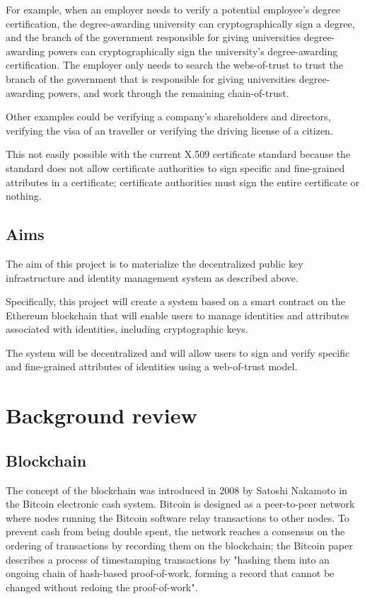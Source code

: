 \documentclass[12pt,a4paper]{report}
\begin{document}
	For example, when an employer needs to verify a potential employee's degree certification, the degree-awarding university can cryptographically sign a degree, and the branch of the government responsible for giving universities degree-awarding powers can cryptographically sign the university's degree-awarding certification. The employer only needs to search the webs-of-trust to trust the branch of the government that is responsible for giving universities degree-awarding powers, and work through the remaining chain-of-trust.
	
	Other examples could be verifying a company's shareholders and directors, verifying the visa of an traveller or verifying the driving license of a citizen.
	
	This not easily possible with the current X.509 certificate standard because the standard does not allow certificate authorities to sign specific and fine-grained attributes in a certificate; certificate authorities must sign the entire certificate or nothing.
	
	
	\section{Aims}
	The aim of this project is to materialize the decentralized public key infrastructure and identity management system as described above.
	
	Specifically, this project will create a system based on a smart contract on the Ethereum blockchain that will enable users to manage identities and attributes associated with identities, including cryptographic keys.
	
	The system will be decentralized and will allow users to sign and verify specific and fine-grained attributes of identities using a web-of-trust model.
	
	\chapter{Background review}
	\section{Blockchain}
	The	concept of the blockchain was introduced in 2008 by Satoshi Nakamoto in the Bitcoin electronic cash system.\cite{9} Bitcoin is designed as a peer-to-peer network where nodes running the Bitcoin software relay transactions to other nodes. To prevent cash from being double spent, the network reaches a consensus on the ordering of transactions by recording them on the blockchain; the Bitcoin paper describes a process of timestamping transactions by "hashing them into an ongoing chain of hash-based proof-of-work, forming a record that cannot be changed without redoing the proof-of-work".
	
\end{document}
